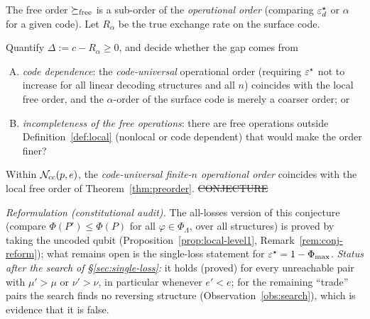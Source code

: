 The free order $\succeq_{\rm free}$ is a sub-order of the \emph{operational order} (comparing $\varepsilon^{\star}_d$ or $\alpha$ for a given code). Let $R_\alpha$ be the true exchange rate on the surface code.
\begin{problem}\label{prob:gap}
Quantify $\Delta:=c-R_\alpha\ge0$, and decide whether the gap comes from
\begin{enumerate}[(A)]
\item \emph{code dependence}: the \emph{code-universal} operational order (requiring $\varepsilon^{\star}$ not to increase for all linear decoding structures and all $n$) coincides with the local free order,
and the $\alpha$-order of the surface code is merely a coarser order; or
\item \emph{incompleteness of the free operations}: there are free operations outside Definition~\ref{def:local} (nonlocal or code dependent) that would make the order finer?
\end{enumerate}
\end{problem}

\begin{conjecture}[Code-universal order = local free order]\label{conj:universal}
Within $\mathcal{N}_{\rm cc}(p,e)$, the \emph{code-universal finite-$n$ operational order} coincides with the local free order of Theorem~\ref{thm:preorder}.
\hfill\st{CONJECTURE}
\end{conjecture}
\noindent\emph{Reformulation (constitutional audit).} The all-losses version of this conjecture (compare $\Phi(P')\le\Phi(P)$ for all $\varphi\in\Phi_\Lambda$, over all structures) is proved by taking the uncoded qubit (Proposition~\ref{prop:local-level1}, Remark~\ref{rem:conj-reform}); what remains open is the single-loss statement for $\varepsilon^{\star}=1-\Phi_{\max}$. \emph{Status after the search of \S\ref{sec:single-loss}:} it holds (proved) for every unreachable pair with $\mu'>\mu$ or $\nu'>\nu$, in particular whenever $e'<e$; for the remaining ``trade'' pairs the search finds no reversing structure (Observation~\ref{obs:search}), which is evidence that it is false.

